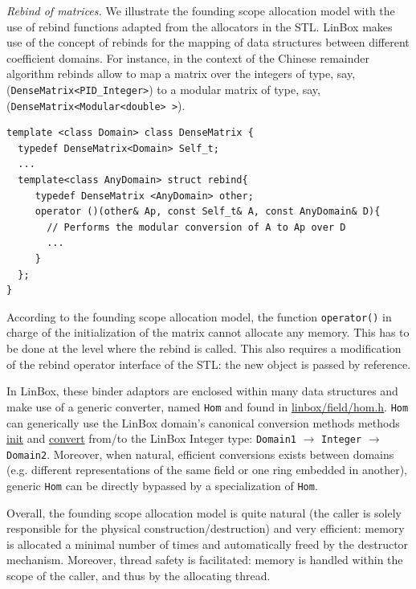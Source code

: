 \documentclass[runningheads,a4paper]{llncs}
\newcommand{\linbox}{{\sc LinBox}\xspace}
\begin{document}
{\em Rebind of matrices.}
We illustrate the founding scope allocation model with the use of rebind
functions adapted from the allocators in the STL.
\linbox makes use of the concept of rebinds for the mapping of data
structures between different coefficient domains.
For instance, in the context of the Chinese remainder algorithm rebinds
allow to map a matrix over the integers of type, say,
(\texttt{DenseMatrix<PID\_Integer>}) to a modular matrix of type, say,
\\(\texttt{DenseMatrix<Modular<double> >}).
\begin{verbatim}
template <class Domain> class DenseMatrix {
  typedef DenseMatrix<Domain> Self_t;
  ... 
  template<class AnyDomain> struct rebind{ 
     typedef DenseMatrix <AnyDomain> other;
     operator ()(other& Ap, const Self_t& A, const AnyDomain& D){
       // Performs the modular conversion of A to Ap over D
       ...
     } 
  };  
}
\end{verbatim}
According to the founding scope allocation model, the function
\texttt{operator()} in charge of the initialization of the matrix cannot 
allocate any memory. This has to be done at the level where the
rebind is called. This also requires a modification of the rebind
operator interface of the STL: the new object is passed by reference.

In \linbox, these binder adaptors are enclosed
within many data structures and make use of a generic
converter, named \texttt{Hom} and found in \url{linbox/field/hom.h}.
\texttt{Hom} can generically use the \linbox domain's canonical
conversion methods methods \url{init} and \url{convert} from/to the \linbox
Integer type: \texttt{Domain1} $\rightarrow$ \texttt{Integer}
$\rightarrow$ \texttt{Domain2}. 
Moreover, when natural, efficient conversions exists between domains
(e.g. different representations of the same field or one ring embedded in another), generic \texttt{Hom} can be directly bypassed by a specialization of \texttt{Hom}.

Overall, the founding scope allocation model is quite natural (the caller is
solely responsible for the physical construction/destruction) and very
efficient: memory is allocated a minimal number of times and
automatically freed by the destructor mechanism. Moreover, thread
safety is facilitated: memory is handled within the scope of the
caller, and thus by the allocating thread. %
\end{document}
